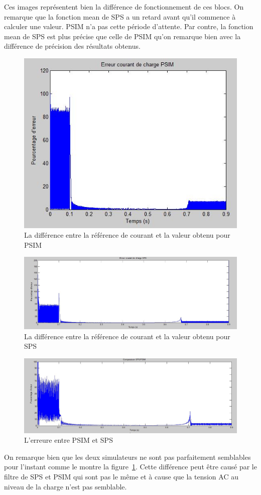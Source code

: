 \documentclass[11pt,letterpaper,final]{report}
\begin{document}
Ces images représentent bien la différence de fonctionnement de ces blocs. On remarque que la fonction mean de SPS a un retard avant qu'il commence à calculer une valeur. PSIM n'a pas cette période d'attente. Par contre, la fonction mean de SPS est plus précise que celle de PSIM qu'on remarque bien  avec la différence de précision des résultats obtenus.
\begin{figure}[h!]
\centering
\includegraphics[scale=0.8]{erreur_PSIM.jpg}
\caption{La différence entre la référence de courant et la valeur obtenu pour PSIM}
\end{figure}

\begin{figure}[h!]
\centering
\includegraphics[scale=0.5]{erreur_SPS.jpg}
\caption{La différence entre la référence de courant et la valeur obtenu pour SPS}
\end{figure}

\begin{figure}[h!]
\centering
\includegraphics[scale=0.5]{comp_PSIM_SPS.jpg}
\caption{L'erreure entre PSIM et SPS}
\label{comp_PSIM_SPS}
\end{figure}

On remarque bien que les deux simulateurs ne sont pas parfaitement semblables pour l'instant comme le montre la figure~\ref{comp_PSIM_SPS}. Cette différence peut être causé par le filtre de SPS et PSIM qui sont pas le même et à cause que la tension AC au niveau de la charge n'est pas semblable. 
\end{document}
